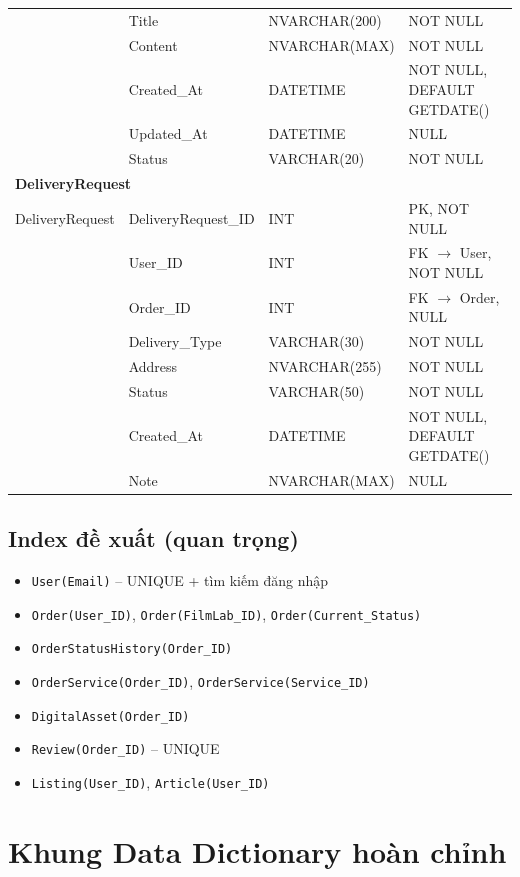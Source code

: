 \documentclass[12pt,a4paper]{article}
\begin{document}
\begin{longtable}{|l|l|l|p{5.8cm}|}
 & Title & NVARCHAR(200) & NOT NULL \\
 & Content & NVARCHAR(MAX) & NOT NULL \\
 & Created\_At & DATETIME & NOT NULL, DEFAULT GETDATE() \\
 & Updated\_At & DATETIME & NULL \\
 & Status & VARCHAR(20) & NOT NULL \\
\hline
\multicolumn{4}{|l|}{\textbf{DeliveryRequest}} \\
\hline
DeliveryRequest & DeliveryRequest\_ID & INT & PK, NOT NULL \\
 & User\_ID & INT & FK $\to$ User, NOT NULL \\
 & Order\_ID & INT & FK $\to$ Order, NULL \\
 & Delivery\_Type & VARCHAR(30) & NOT NULL \\
 & Address & NVARCHAR(255) & NOT NULL \\
 & Status & VARCHAR(50) & NOT NULL \\
 & Created\_At & DATETIME & NOT NULL, DEFAULT GETDATE() \\
 & Note & NVARCHAR(MAX) & NULL \\
\hline
\end{longtable}

\subsection{Index đề xuất (quan trọng)}
\begin{itemize}[leftmargin=*]
  \item \texttt{User(Email)} -- UNIQUE + tìm kiếm đăng nhập
  \item \texttt{Order(User\_ID)}, \texttt{Order(FilmLab\_ID)}, \texttt{Order(Current\_Status)}
  \item \texttt{OrderStatusHistory(Order\_ID)}
  \item \texttt{OrderService(Order\_ID)}, \texttt{OrderService(Service\_ID)}
  \item \texttt{DigitalAsset(Order\_ID)}
  \item \texttt{Review(Order\_ID)} -- UNIQUE
  \item \texttt{Listing(User\_ID)}, \texttt{Article(User\_ID)}
\end{itemize}

\section{Khung Data Dictionary hoàn chỉnh}
\end{document}
